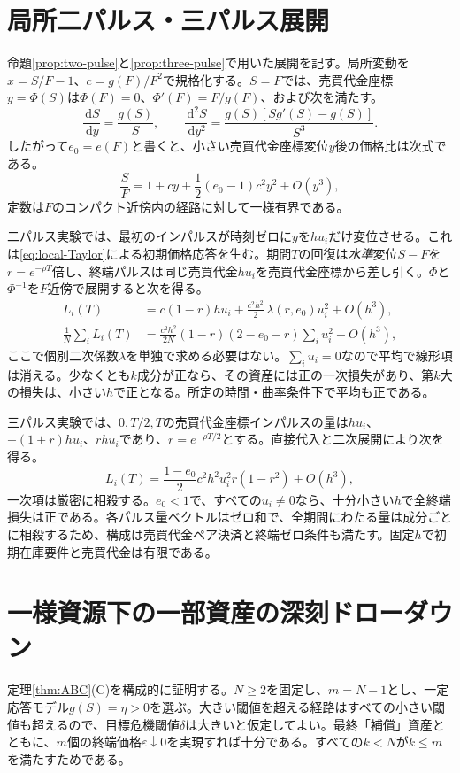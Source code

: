 \documentclass[11pt]{article}
\numberwithin{equation}{section}
\theoremstyle{definition}
\theoremstyle{remark}
\newcommand{\dd}{\,\mathrm{d}}
\begin{document}
\section{局所二パルス・三パルス展開}\label{app:local}
命題\ref{prop:two-pulse}と\ref{prop:three-pulse}で用いた展開を記す。局所変動を$x=S/F-1$、$c=g(F)/F^2$で規格化する。$S=F$では、売買代金座標$y=\Phi(S)$は$\Phi(F)=0$、$\Phi'(F)=F/g(F)$、および次を満たす。
\begin{equation}\label{eq:local-inverse}
\frac{\dd S}{\dd y}=\frac{g(S)}S,
\qquad
\frac{\dd^2 S}{\dd y^2}=
\frac{g(S)[Sg'(S)-g(S)]}{S^3}.
\end{equation}
したがって$e_0=e(F)$と書くと、小さい売買代金座標変位$y$後の価格比は次式である。
\begin{equation}\label{eq:local-Taylor}
\frac SF=1+cy+\frac12(e_0-1)c^2y^2+O(y^3),
\end{equation}
定数は$F$のコンパクト近傍内の経路に対して一様有界である。

二パルス実験では、最初のインパルスが時刻ゼロに$y$を$hu_i$だけ変位させる。これは\eqref{eq:local-Taylor}による初期価格応答を生む。期間$T$の回復は\emph{水準}変位$S-F$を$r=e^{-\rho T}$倍し、終端パルスは同じ売買代金$hu_i$を売買代金座標から差し引く。$\Phi$と$\Phi^{-1}$を$F$近傍で展開すると次を得る。
\begin{align}\label{eq:local-two}
L_i(T)&=c(1-r)hu_i+\frac{c^2h^2}{2}\,\lambda(r,e_0)u_i^2+O(h^3),\\
\frac1N\sum_i L_i(T)&=\frac{c^2h^2}{2N}(1-r)(2-e_0-r)\sum_i u_i^2+O(h^3),\nonumber
\end{align}
ここで個別二次係数$\lambda$を単独で求める必要はない。$\sum_i u_i=0$なので平均で線形項は消える。少なくとも$k$成分が正なら、その資産には正の一次損失があり、第$k$大の損失は、小さい$h$で正となる。所定の時間・曲率条件下で平均も正である。

三パルス実験では、$0,T/2,T$の売買代金座標インパルスの量は$hu_i$、$-(1+r)hu_i$、$rhu_i$であり、$r=e^{-\rho T/2}$とする。直接代入と二次展開により次を得る。
\begin{equation}\label{eq:local-three}
L_i(T)=\frac{1-e_0}{2}c^2h^2u_i^2r(1-r^2)+O(h^3),
\end{equation}
一次項は厳密に相殺する。$e_0<1$で、すべての$u_i\ne0$なら、十分小さい$h$で全終端損失は正である。各パルス量ベクトルはゼロ和で、全期間にわたる量は成分ごとに相殺するため、構成は売買代金ペア決済と終端ゼロ条件も満たす。固定$h$で初期在庫要件と売買代金は有限である。

\section{一様資源下の一部資産の深刻ドローダウン}\label{app:severe}
定理\ref{thm:ABC}(C)を構成的に証明する。$N\ge2$を固定し、$m=N-1$とし、一定応答モデル$g(S)=\eta>0$を選ぶ。大きい閾値を超える経路はすべての小さい閾値も超えるので、目標危機閾値$\delta$は大きいと仮定してよい。最終「補償」資産とともに、$m$個の終端価格$\varepsilon\downarrow0$を実現すれば十分である。すべての$k<N$が$k\le m$を満たすためである。
\end{document}
